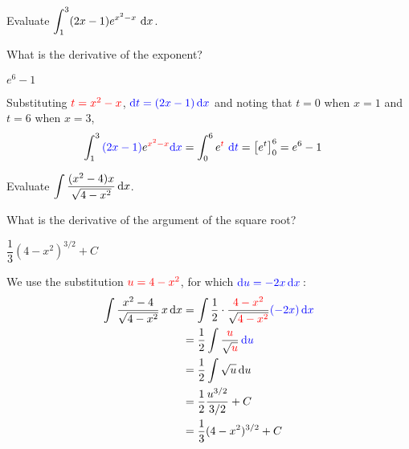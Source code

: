 \begin{question}[2013A]
Evaluate
$\displaystyle\int_1^3(2x-1)e^{x^2-x}\ \dee{x}$.
\end{question}

\begin{hint}
What is the derivative of the exponent?
\end{hint}

\begin{answer}
$e^6-1$
\end{answer}

\begin{solution}
Substituting $\textcolor{red}{t=x^2-x}$,  $\textcolor{blue}{\mathrm{d}t = (2x-1)\,\mathrm{d}x}$ and noting that $t=0$
when $x=1$ and $t=6$ when $x=3$,
\begin{align*}
\int_1^3 \textcolor{blue}{(2x-1)}e^{\textcolor{red}{x^2-x}}\textcolor{blue}{ \mathrm{d}x}
&=  \int_0^6 e^{\textcolor{red}t}\ \textcolor{blue}{\mathrm{d}t }
=\big[e^t\big]_0^6
=e^6-1
\end{align*}

\end{solution}


\begin{Mquestion}[2016Q2]
Evaluate ${\displaystyle \int \frac{(x^2-4)x}{\sqrt{4-x^2}}\,\mathrm{d}x}$.
\end{Mquestion}

\begin{hint}
What is the derivative of the argument of the square root?
\end{hint}

\begin{answer}
$\dfrac{1}{3}(4-x^2)^{3/2}+C$
\end{answer}

\begin{solution}
We use the substitution $\textcolor{red}{u=4-x^2}$, for which $\textcolor{blue}{\mathrm{d}u=-2x\,\mathrm{d}x}$\,:
\begin{align*}
\int \frac{x^2-4}{\sqrt{4-x^2}}\,x\,\mathrm{d}x
&=\int \frac{1}{2}\cdot\frac{\textcolor{red}{4-x^2}}{\sqrt{\textcolor{red}{4-x^2}}}\textcolor{blue}{ ({-}2x)\,\mathrm{d}x} \\
&=\frac{1}{2} \int \frac{\textcolor{red}u}{\sqrt{\textcolor{red}u}}\,\textcolor{blue}{\mathrm{d}u }\\
&=\frac{1}{2}\int \sqrt{u}\,\mathrm{d}u \\
&=\frac{1}{2}\frac{u^{3/2}}{3/2}+C\\
&=\frac{1}{3}(4-x^2)^{3/2}+C
\end{align*}
\end{solution}

